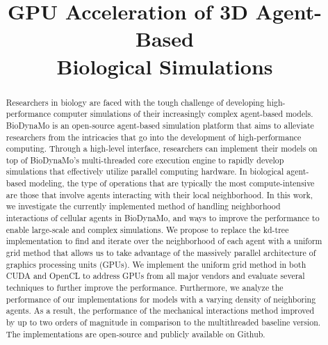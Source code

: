 \documentclass[conference]{IEEEtran}
\begin{document}
\title{GPU Acceleration of 3D Agent-Based\\Biological Simulations}

\author{
\and
{}
\and
{}
\and
{}
}

\maketitle

\begin{abstract}
Researchers in biology are faced with the tough challenge of developing high-performance computer simulations of their increasingly complex agent-based models.
BioDynaMo is an open-source agent-based simulation platform that aims to alleviate researchers from the intricacies that go into the development of high-performance computing.
Through a high-level interface, researchers can implement their models on top of BioDynaMo’s multi-threaded core execution engine to rapidly develop simulations that effectively utilize parallel computing hardware.
In biological agent-based modeling, the type of operations that are typically the most compute-intensive are those that involve agents interacting with their local neighborhood.
In this work, we investigate the currently implemented method of handling neighborhood interactions of cellular agents in BioDynaMo, and ways to improve the performance to enable large-scale and complex simulations.
We propose to replace the kd-tree implementation to find and iterate over the neighborhood of each agent with a uniform grid method that allows us to take advantage of the massively parallel architecture of graphics processing units (GPUs).
We implement the uniform grid method in both CUDA and OpenCL to address GPUs from all major vendors and evaluate several techniques to further improve the performance.
Furthermore, we analyze the performance of our implementations for models with a varying density of neighboring agents.
As a result, the performance of the mechanical interactions method improved by up to two orders of magnitude in comparison to the multithreaded baseline version.
The implementations are open-source and publicly available on Github.
\end{abstract}
\end{document}
